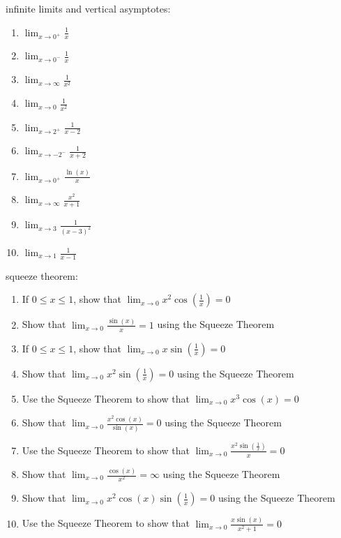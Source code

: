 \documentclass{article}
\begin{document}
infinite limits and vertical asymptotes:
\begin{enumerate}
        \item $\lim_{x \to 0^+} \frac{1}{x}$
        \item $\lim_{x \to 0^-} \frac{1}{x}$
        \item $\lim_{x \to \infty} \frac{1}{x^2}$
        \item $\lim_{x \to 0} \frac{1}{x^2}$
        \item $\lim_{x \to 2^+} \frac{1}{x-2}$
        \item $\lim_{x \to -2^-} \frac{1}{x+2}$
        \item $\lim_{x \to 0^+} \frac{\ln(x)}{x}$
        \item $\lim_{x \to \infty} \frac{x^2}{x+1}$
        \item $\lim_{x \to 3} \frac{1}{(x-3)^2}$
        \item $\lim_{x \to 1} \frac{1}{x-1}$
\end{enumerate}

squeeze theorem:
\begin{enumerate}
        \item If $0 \leq x \leq 1$, show that $\lim_{x \to 0} x^2 \cos\left(\frac{1}{x}\right) = 0$
        \item Show that $\lim_{x \to 0} \frac{\sin(x)}{x} = 1$ using the Squeeze Theorem
        \item If $0 \leq x \leq 1$, show that $\lim_{x \to 0} x \sin\left(\frac{1}{x}\right) = 0$
        \item Show that $\lim_{x \to 0} x^2 \sin\left(\frac{1}{x}\right) = 0$ using the Squeeze Theorem
        \item Use the Squeeze Theorem to show that $\lim_{x \to 0} x^3 \cos(x) = 0$
        \item Show that $\lim_{x \to 0} \frac{x^2 \cos(x)}{\sin(x)} = 0$ using the Squeeze Theorem
        \item Use the Squeeze Theorem to show that $\lim_{x \to 0} \frac{x^2 \sin\left(\frac{1}{x}\right)}{x} = 0$
        \item Show that $\lim_{x \to 0} \frac{\cos(x)}{x^2} = \infty$ using the Squeeze Theorem
        \item Show that $\lim_{x \to 0} x^2 \cos(x) \sin\left(\frac{1}{x}\right) = 0$ using the Squeeze Theorem
        \item Use the Squeeze Theorem to show that $\lim_{x \to 0} \frac{x \sin(x)}{x^2 + 1} = 0$
\end{enumerate}
\end{document}
